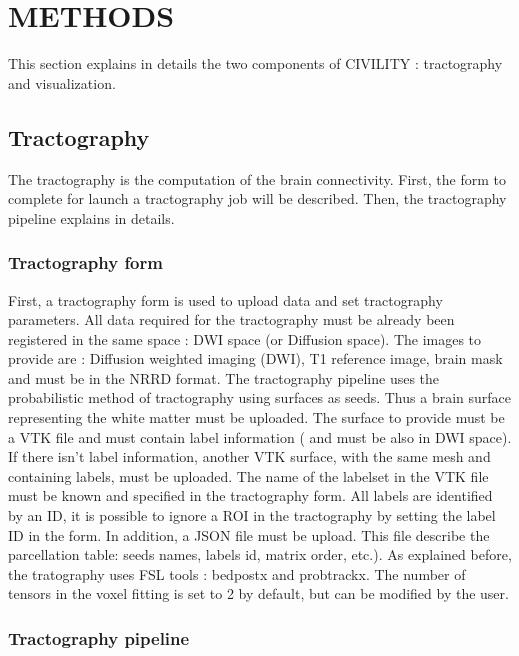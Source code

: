 \documentclass[]{spie}  %
\begin{document}
\section{METHODS} 
\label{sec:METHODS}

This section explains in details the two components of CIVILITY : tractography and visualization.

\subsection{Tractography}

The tractography is the computation of the brain connectivity. First, the form to complete for launch a tractography job will be described. Then, the tractography pipeline explains in details.

\subsubsection{Tractography form}

First, a tractography form is used to upload data and set tractography parameters.
All data required for the tractography must be already been registered in the same space : DWI space (or Diffusion space). The images to provide are : Diffusion weighted imaging (DWI), T1 reference image, brain mask and must be in the NRRD format. The tractography pipeline uses the probabilistic method of tractography using surfaces as seeds. Thus a brain surface representing the white matter must be uploaded. The surface to provide must be a VTK file and must contain label information ( and must be also in DWI space). If there isn't label information, another VTK surface, with the same mesh and containing labels, must be uploaded. The name of the labelset in the VTK file must be known and specified in the tractography form. All labels are identified by an ID, it is possible to ignore a ROI in the tractography by setting the label ID in the form. 
In addition, a JSON file must be upload. This file describe the parcellation table: seeds names, labels id, matrix order, etc.). 
As explained before, the tratography uses FSL tools : bedpostx and probtrackx. The number of tensors in the voxel fitting is set to 2 by default, but can be modified by the user.

\subsubsection{Tractography pipeline}
\end{document}
